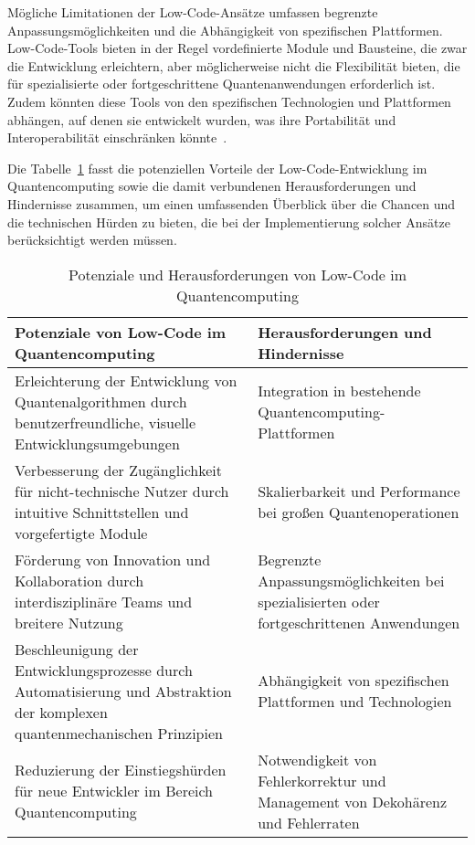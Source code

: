 Mögliche Limitationen der Low-Code-Ansätze umfassen begrenzte Anpassungsmöglichkeiten und die 
Abhängigkeit von spezifischen Plattformen. Low-Code-Tools bieten in der Regel vordefinierte 
Module und Bausteine, die zwar die Entwicklung erleichtern, aber möglicherweise nicht die 
Flexibilität bieten, die für spezialisierte oder fortgeschrittene Quantenanwendungen erforderlich 
ist. Zudem könnten diese Tools von den spezifischen Technologien und Plattformen abhängen, auf denen 
sie entwickelt wurden, was ihre Portabilität und Interoperabilität einschränken könnte~\cite{nielsen2010quantum}.

Die Tabelle~\ref{tab:lowcode_potentials_challenges} fasst die potenziellen Vorteile der 
Low-Code-Entwicklung im Quantencomputing sowie die damit verbundenen Herausforderungen und Hindernisse 
zusammen, um einen umfassenden Überblick über die Chancen und die technischen Hürden zu bieten, die 
bei der Implementierung solcher Ansätze berücksichtigt werden müssen.

\begin{table}[h!]
    \centering
    \begin{tabular}{|p{7cm}|p{7cm}|}
    \hline
    \textbf{Potenziale von Low-Code im Quantencomputing} & \textbf{Herausforderungen und Hindernisse} \\
    \hline
    Erleichterung der Entwicklung von Quantenalgorithmen durch benutzerfreundliche, visuelle Entwicklungsumgebungen & Integration in bestehende Quantencomputing-Plattformen \\
    \hline
    Verbesserung der Zugänglichkeit für nicht-technische Nutzer durch intuitive Schnittstellen und vorgefertigte Module & Skalierbarkeit und Performance bei großen Quantenoperationen \\
    \hline
    Förderung von Innovation und Kollaboration durch interdisziplinäre Teams und breitere Nutzung & Begrenzte Anpassungsmöglichkeiten bei spezialisierten oder fortgeschrittenen Anwendungen \\
    \hline
    Beschleunigung der Entwicklungsprozesse durch Automatisierung und Abstraktion der komplexen quantenmechanischen Prinzipien & Abhängigkeit von spezifischen Plattformen und Technologien \\
    \hline
    Reduzierung der Einstiegshürden für neue Entwickler im Bereich Quantencomputing & Notwendigkeit von Fehlerkorrektur und Management von Dekohärenz und Fehlerraten \\
    \hline
    \end{tabular}
    \caption{Potenziale und Herausforderungen von Low-Code im Quantencomputing}
    \label{tab:lowcode_potentials_challenges}
\end{table}
    
